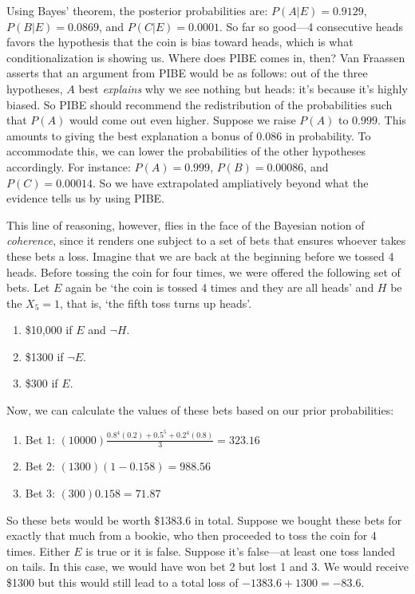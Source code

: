 Using Bayes' theorem, the posterior probabilities are:
\(P(A|E) = 0.9129\), \(P(B|E) = 0.0869\), and \(P(C|E) = 0.0001\). So
far so good---4 consecutive heads favors the hypothesis that the coin is
bias toward heads, which is what conditionalization is showing us. Where
does PIBE comes in, then? Van Fraassen asserts that an argument from
PIBE would be as follows: out of the three hypotheses, \(A\) best
\emph{explains} why we see nothing but heads: it's because it's highly
biased. So PIBE should recommend the redistribution of the
probabilities such that \(P(A)\) would come out even higher. Suppose we raise
\(P(A)\) to \(0.999\). This amounts to giving the best explanation a
bonus of \(0.086\) in probability. To accommodate this, we can lower the
probabilities of the other hypotheses accordingly. For instance:
\(P(A) = 0.999\), \(P(B) = 0.00086\), and \(P(C) = 0.00014\). So we have
extrapolated ampliatively beyond what the evidence tells us by using
PIBE.

This line of reasoning, however, flies in the face of the Bayesian
notion of \emph{coherence}, since it renders one subject to a set of bets
that ensures whoever takes these bets a loss. Imagine that we are back
at the beginning before we tossed 4 heads. Before tossing the coin for
four times, we were offered the following set of bets. Let \(E\) again
be `the coin is tossed 4 times and they are all heads' and \(H\) be the
\(X_5=1\), that is, `the fifth toss turns up heads'.

\begin{enumerate}
\def\labelenumi{\arabic{enumi}.}
\tightlist
\item
  \$10,000 if \(E\) and \(\neg H\).
\item
  \$1300 if \(\neg E\).
\item
  \$300 if \(E\).
\end{enumerate}

Now, we can calculate the values of these bets based on our prior
probabilities:

\begin{enumerate}
\def\labelenumi{\arabic{enumi}.}
\tightlist
\item
  Bet 1: \((10000) \frac{0.8^4(0.2) + 0.5^5 + 0.2^4(0.8)}{3} = 323.16\)
\item
  Bet 2: \((1300) (1-0.158) = 988.56\)
\item
  Bet 3: \((300) 0.158 = 71.87\)
\end{enumerate}

So these bets would be worth \$1383.6 in total. Suppose we bought these
bets for exactly that much from a bookie, who then proceeded to toss the
coin for 4 times. Either \(E\) is true or it is false. Suppose it's
false---at least one toss landed on tails. In this case, we would have
won bet 2 but lost 1 and 3. We would receive \$1300 but this would still
lead to a total loss of \(-1383.6+1300=-83.6\).

